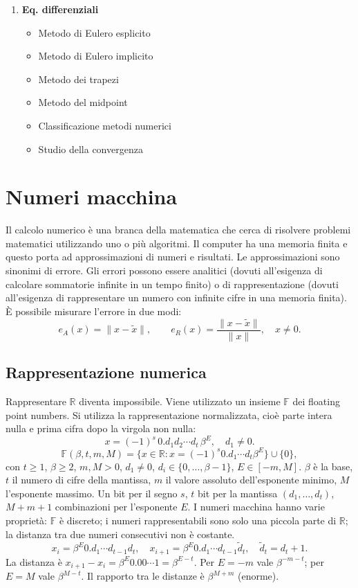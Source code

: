 \documentclass[11pt,a4paper]{article}
\newcommand{\R}{\mathbb R}\newcommand{\F}{\mathbb F}\newcommand{\tr}{\operatorname{tr}}\newcommand{\ar}{\operatorname{arr}}\newcommand{\fl}{\operatorname{fl}}
\newcommand{\pagina}[1]{\clearpage}
\begin{document}
\begin{enumerate}
\begin{itemize}
\item Differenze in avanti
\item Differenze all’indietro
\end{itemize}
\item \textbf{Eq. differenziali}
\begin{itemize}
\item Metodo di Eulero esplicito
\item Metodo di Eulero implicito
\item Metodo dei trapezi
\item Metodo del midpoint
\item Classificazione metodi numerici
\item Studio della convergenza
\end{itemize}
\end{enumerate}
\pagina{2}\section{Numeri macchina}
Il calcolo numerico è una branca della matematica che cerca di risolvere problemi matematici utilizzando uno o più algoritmi. Il computer ha una memoria finita e questo porta ad approssimazioni di numeri e risultati. Le approssimazioni sono sinonimi di errore. Gli errori possono essere analitici (dovuti all'esigenza di calcolare sommatorie infinite in un tempo finito) o di rappresentazione (dovuti all'esigenza di rappresentare un numero con infinite cifre in una memoria finita).
È possibile misurare l'errore in due modi:
\[e_A(x)=\|x-\widetilde x\|,\qquad e_R(x)=\frac{\|x-\widetilde x\|}{\|x\|},\quad x\ne0.\]
\subsection*{Rappresentazione numerica}
Rappresentare $\R$ diventa impossibile. Viene utilizzato un insieme $\F$ dei floating point numbers. Si utilizza la rappresentazione normalizzata, cioè parte intera nulla e prima cifra dopo la virgola non nulla:
\[x=(-1)^s\,0.d_1d_2\cdots d_t\,\beta^E,\quad d_1\ne0.\]
\[\F(\beta,t,m,M)=\{x\in\R:x=(-1)^s0.d_1\cdots d_t\beta^E\}\cup\{0\},\]
con $t\ge1$, $\beta\ge2$, $m,M>0$, $d_1\ne0$, $d_i\in\{0,\ldots,\beta-1\}$, $E\in[-m,M]$. $\beta$ è la base, $t$ il numero di cifre della mantissa, $m$ il valore assoluto dell'esponente minimo, $M$ l'esponente massimo.
\pagina{3}
Un bit per il segno $s$, $t$ bit per la mantissa $(d_1,\ldots,d_t)$, $M+m+1$ combinazioni per l'esponente $E$.
I numeri macchina hanno varie proprietà: $\F$ è discreto; i numeri rappresentabili sono solo una piccola parte di $\R$; la distanza tra due numeri consecutivi non è costante.
\[x_i=\beta^E0.d_1\cdots d_{t-1}d_t,\quad x_{i+1}=\beta^E0.d_1\cdots d_{t-1}\widetilde d_t,\quad\widetilde d_t=d_t+1.\]
La distanza è $x_{i+1}-x_i=\beta^E0.00\cdots1=\beta^{E-t}$. Per $E=-m$ vale $\beta^{-m-t}$; per $E=M$ vale $\beta^{M-t}$. Il rapporto tra le distanze è $\beta^{M+m}$ (enorme).
\end{document}
